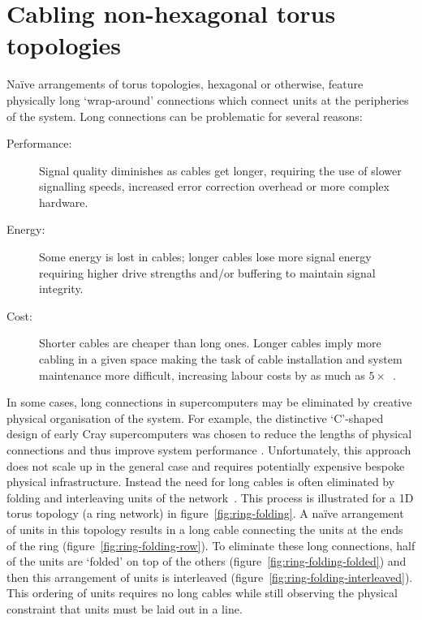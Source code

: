 	\section{Cabling non-hexagonal torus topologies}
		
		Na\"ive arrangements of torus topologies, hexagonal or otherwise, feature
		physically long `wrap-around' connections which connect units at the
		peripheries of the system. Long connections can be problematic for several
		reasons:
		
		\begin{description}
			
			\item[Performance:] Signal quality diminishes as cables get longer,
			requiring the use of slower signalling speeds, increased error
			correction overhead or more complex hardware.
			
			\item[Energy:] Some energy is lost in cables; longer cables lose more
			signal energy requiring higher drive strengths and/or buffering to
			maintain signal integrity.
			
			\item[Cost:] Shorter cables are cheaper than long ones.  Longer cables
			imply more cabling in a given space making the task of cable installation
			and system maintenance more difficult, increasing labour costs by as much
			as $5\times$~\cite{curtis12}.
			
		\end{description}
		
		In some cases, long connections in supercomputers may be eliminated by
		creative physical organisation of the system. For example, the distinctive
		`C'-shaped design of early Cray supercomputers was chosen to reduce the
		lengths of physical connections and thus improve system performance
		\cite{thocp13}. Unfortunately, this approach does not scale up in the
		general case and requires potentially expensive bespoke physical
		infrastructure.  Instead the need for long cables is often eliminated by
		folding and interleaving units of the network~\cite[chapter~5]{dally04}.
		This process is illustrated for a 1D torus topology (a ring network) in
		figure~\ref{fig:ring-folding}. A na\"ive arrangement of units in this
		topology results in a long cable connecting the units at the ends of the
		ring (figure~\ref{fig:ring-folding-row}).  To eliminate these long
		connections, half of the units are `folded' on top of the others
		(figure~\ref{fig:ring-folding-folded}) and then this arrangement of units
		is interleaved (figure~\ref{fig:ring-folding-interleaved}). This ordering
		of units requires no long cables while still observing the physical
		constraint that units must be laid out in a line.
		
